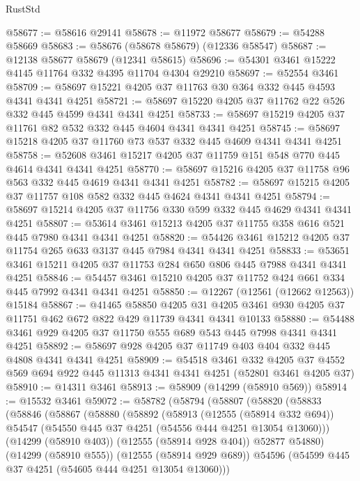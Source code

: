 \begin{lexlean}{RustStd}
\begin{coremodule}
@58677 := @58616 @29141
@58678 := @11972 @58677
@58679 := @54288 @58669
@58683 := @58676 (@58678 @58679) (@12336 @58547)
@58687 := @12138 @58677 @58679 (@12341 @58615)
@58696 := @54301 @3461 @15222 @4145 @11764 @332 @4395 @11704 @4304 @29210
@58697 := @52554 @3461
@58709 := @58697 @15221 @4205 @37 @11763 @30 @364 @332 @445 @4593 @4341 @4341 @4251
@58721 := @58697 @15220 @4205 @37 @11762 @22 @526 @332 @445 @4599 @4341 @4341 @4251
@58733 := @58697 @15219 @4205 @37 @11761 @82 @532 @332 @445 @4604 @4341 @4341 @4251
@58745 := @58697 @15218 @4205 @37 @11760 @73 @537 @332 @445 @4609 @4341 @4341 @4251
@58758 := @52608 @3461 @15217 @4205 @37 @11759 @151 @548 @770 @445 @4614 @4341 @4341 @4251
@58770 := @58697 @15216 @4205 @37 @11758 @96 @563 @332 @445 @4619 @4341 @4341 @4251
@58782 := @58697 @15215 @4205 @37 @11757 @108 @582 @332 @445 @4624 @4341 @4341 @4251
@58794 := @58697 @15214 @4205 @37 @11756 @330 @599 @332 @445 @4629 @4341 @4341 @4251
@58807 := @53614 @3461 @15213 @4205 @37 @11755 @358 @616 @521 @445 @7980 @4341 @4341 @4251
@58820 := @54426 @3461 @15212 @4205 @37 @11754 @265 @633 @3137 @445 @7984 @4341 @4341 @4251
@58833 := @53651 @3461 @15211 @4205 @37 @11753 @284 @650 @806 @445 @7988 @4341 @4341 @4251
@58846 := @54457 @3461 @15210 @4205 @37 @11752 @424 @661 @334 @445 @7992 @4341 @4341 @4251
@58850 := @12267 (@12561 (@12662 @12563)) @15184
@58867 := @41465
    @58850
    @4205
    @31
    @4205
    @3461
    @930
    @4205
    @37
    @11751
    @462
    @672
    @822
    @429
    @11739
    @4341
    @4341
    @10133
@58880 := @54488 @3461 @929 @4205 @37 @11750 @555 @689 @543 @445 @7998 @4341 @4341 @4251
@58892 := @58697 @928 @4205 @37 @11749 @403 @404 @332 @445 @4808 @4341 @4341 @4251
@58909 := @54518
    @3461
    @332
    @4205
    @37
    @4552
    @569
    @694
    @922
    @445
    @11313
    @4341
    @4341
    @4251
    (@52801 @3461 @4205 @37)
@58910 := @14311 @3461
@58913 := @58909 (@14299 (@58910 @569))
@58914 := @15532 @3461
@59072 := @58782
    (@58794
      (@58807
        (@58820
          (@58833
            (@58846
              (@58867
                (@58880
                  (@58892
                    (@58913
                      (@12555 (@58914 @332 @694))
                      @54547
                      (@54550 @445 @37 @4251 (@54556 @444 @4251 @13054 @13060)))
                    (@14299 (@58910 @403))
                    (@12555 (@58914 @928 @404))
                    @52877
                    @54880)
                  (@14299 (@58910 @555))
                  (@12555 (@58914 @929 @689))
                  @54596
                  (@54599 @445 @37 @4251 (@54605 @444 @4251 @13054 @13060)))

\end{coremodule}
\end{lexlean}
